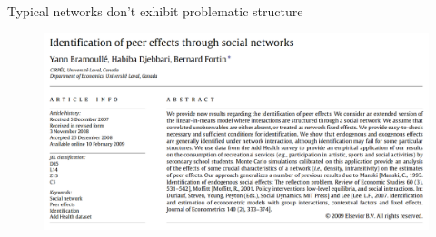 \documentclass[aspectratio=169]{beamer}
\theoremstyle{remark}
\begin{document}


\begin{frame}{Typical networks don't exhibit problematic structure}
    \begin{figure}
        \centering
        \includegraphics[width=\textwidth]{./bramoulle2009.png}
    \end{figure}
\end{frame}
\end{document}
